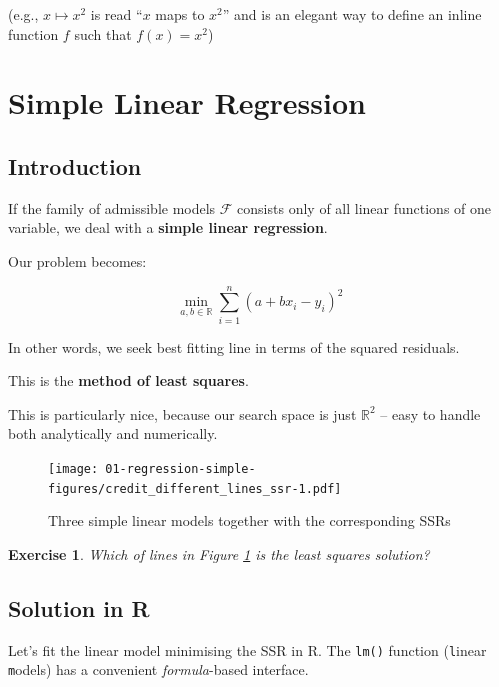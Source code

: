 \documentclass[10pt,b5paper,krantz1]{krantz}
\newtheorem{exercise}{Exercise}[chapter]
\begin{document}
(e.g., \(x\mapsto x^2\) is read ``\(x\) maps to \(x^2\)'' and is
an elegant way to define an inline function \(f\) such that \(f(x)=x^2\))

\hypertarget{simple-linear-regression-1}{%
\section{Simple Linear Regression}\label{simple-linear-regression-1}}

\hypertarget{introduction-1}{%
\subsection{Introduction}\label{introduction-1}}

If the family of admissible models \(\mathcal{F}\) consists only of all linear functions of one variable,
we deal with a \textbf{simple linear regression}.

Our problem becomes:

\[
\min_{a,b\in\mathbb{R}} \sum_{i=1}^n \left(
a+bx_i-y_i
\right)^2
\]

In other words, we seek best fitting line in terms of the squared residuals.

This is the \textbf{method of least squares}.

This is particularly nice, because our search space
is just \(\mathbb{R}^2\) -- easy to handle both analytically and numerically.

\begin{figure}
\hypertarget{fig:credit_different_lines_ssr}{%
\centering
\texttt{[image: 01-regression-simple-figures/credit\_different\_lines\_ssr-1.pdf]}
\caption{Three simple linear models together with the corresponding SSRs}\label{fig:credit_different_lines_ssr}
}
\end{figure}

\begin{exercise}

Which of lines in Figure \ref{fig:credit_different_lines_ssr} is the least squares solution?

\end{exercise}

\hypertarget{solution-in-r}{%
\subsection{Solution in R}\label{solution-in-r}}

Let's fit the linear model minimising the SSR in R.
The \texttt{lm()} function (\texttt{l}inear \texttt{m}odels) has a convenient \emph{formula}-based interface.
\end{document}

